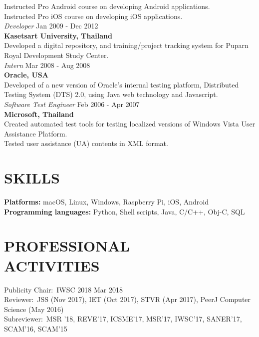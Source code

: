 \documentclass[margin, 10pt]{res} %
\begin{document}
\begin{resume}
Instructed Pro Android course on developing Android applications.\\
Instructed Pro iOS course on developing iOS applications. \vspace{3mm} \\
{\sl Developer} \hfill Jan 2009 - Dec 2012 \\
\textbf{Kasetsart University, Thailand}\\
Developed a digital repository, and training/project tracking system for Puparn Royal Development Study Center. \vspace{3mm} \\
{\sl Intern} \hfill Mar 2008 - Aug 2008 \\
\textbf{Oracle, USA}\\
Developed of a new version of Oracle's internal testing platform, Distributed  
Testing System (DTS) 2.0, using Java web technology and Javascript. \vspace{3mm} \\
{\sl Software Test Engineer} \hfill Feb 2006 - Apr 2007\\
\textbf{Microsoft, Thailand}\\
Created automated test tools for testing localized versions of Windows Vista User Assistance Platform.\\
Tested user assistance (UA) contents in XML format.


\section{SKILLS}
\textbf{Platforms: } macOS, Linux, Windows, Raspberry Pi, iOS, Android \\
\textbf{Programming languages: } Python, Shell scripts, Java, C/C++, Obj-C, SQL


\section{PROFESSIONAL \\ ACTIVITIES} 
Publicity Chair:~IWSC 2018 \hfill Mar 2018 \\
Reviewer:~JSS (Nov 2017), IET (Oct 2017), STVR (Apr 2017), PeerJ Computer Science (May 2016) \\
Subreviewer:~MSR '18, REVE'17, ICSME'17, MSR'17, IWSC'17, SANER'17, SCAM'16, SCAM'15


\end{resume}
\end{document}
